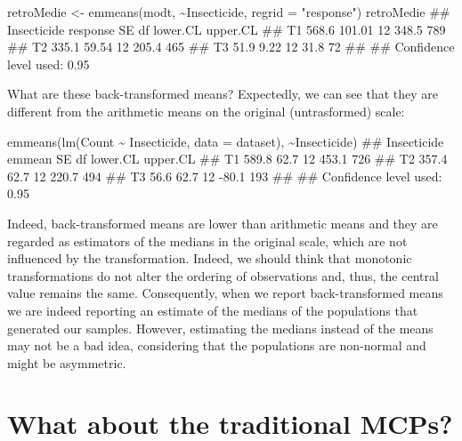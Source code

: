 \documentclass[a4paper,12pt,oneside]{book}
\newenvironment{Shaded}{\begin{snugshade}}{\end{snugshade}}
\newcommand{\SpecialCharTok}[1]{#1}
\newcommand{\StringTok}[1]{#1}
\newcommand{\DocumentationTok}[1]{#1}
\newcommand{\OtherTok}[1]{#1}
\newcommand{\FunctionTok}[1]{#1}
\newcommand{\AttributeTok}[1]{#1}
\newcommand{\NormalTok}[1]{#1}
\begin{document}
\begin{Shaded}
\begin{Highlighting}[]
\NormalTok{retroMedie }\OtherTok{\textless{}{-}} \FunctionTok{emmeans}\NormalTok{(modt, }\SpecialCharTok{\textasciitilde{}}\NormalTok{Insecticide, }\AttributeTok{regrid =} \StringTok{"response"}\NormalTok{)}
\NormalTok{retroMedie}
\DocumentationTok{\#\#  Insecticide response     SE df lower.CL upper.CL}
\DocumentationTok{\#\#  T1             568.6 101.01 12    348.5      789}
\DocumentationTok{\#\#  T2             335.1  59.54 12    205.4      465}
\DocumentationTok{\#\#  T3              51.9   9.22 12     31.8       72}
\DocumentationTok{\#\# }
\DocumentationTok{\#\# Confidence level used: 0.95}
\end{Highlighting}
\end{Shaded}

What are these back-transformed means? Expectedly, we can see that they are different from the arithmetic means on the original (untrasformed) scale:

\begin{Shaded}
\begin{Highlighting}[]
\FunctionTok{emmeans}\NormalTok{(}\FunctionTok{lm}\NormalTok{(Count }\SpecialCharTok{\textasciitilde{}}\NormalTok{ Insecticide, }\AttributeTok{data =}\NormalTok{ dataset), }\SpecialCharTok{\textasciitilde{}}\NormalTok{Insecticide)}
\DocumentationTok{\#\#  Insecticide emmean   SE df lower.CL upper.CL}
\DocumentationTok{\#\#  T1           589.8 62.7 12    453.1      726}
\DocumentationTok{\#\#  T2           357.4 62.7 12    220.7      494}
\DocumentationTok{\#\#  T3            56.6 62.7 12    {-}80.1      193}
\DocumentationTok{\#\# }
\DocumentationTok{\#\# Confidence level used: 0.95}
\end{Highlighting}
\end{Shaded}

Indeed, back-transformed means are lower than arithmetic means and they are regarded as estimators of the medians in the original scale, which are not influenced by the transformation. Indeed, we should think that monotonic transformations do not alter the ordering of observations and, thus, the central value remains the same. Consequently, when we report back-transformed means we are indeed reporting an estimate of the medians of the populations that generated our samples. However, estimating the medians instead of the means may not be a bad idea, considering that the populations are non-normal and might be asymmetric.

\hypertarget{what-about-the-traditional-mcps}{%
\section{What about the traditional MCPs?}\label{what-about-the-traditional-mcps}}
\end{document}
